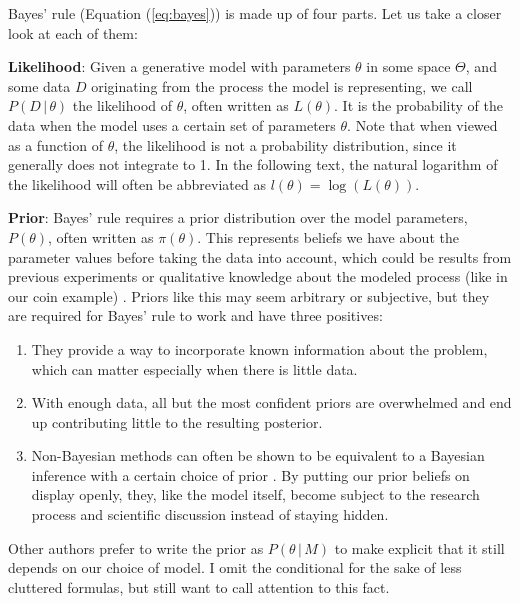 \documentclass[12pt, a4paper]{report}
\begin{document}
Bayes' rule (Equation (\ref{eq:bayes})) is made up of four parts.
Let us take a closer look at each of them:

\textbf{Likelihood}: Given a generative model with parameters $\theta$ in some space $\Theta$, and some data $D$ originating from the process the model is representing, we call $P(D \,|\, \theta)$ the likelihood of $\theta$, often written as $L(\theta)$.
It is the probability of the data when the model uses a certain set of parameters $\theta$.
Note that when viewed as a function of $\theta$, the likelihood is not a probability distribution, since it generally does not integrate to 1.
In the following text, the natural logarithm of the likelihood will often be abbreviated as $l(\theta) = \log(L(\theta))$.

\textbf{Prior}: Bayes' rule requires a prior distribution over the model parameters, $P(\theta)$, often written as $\pi(\theta)$.
This represents beliefs we have about the parameter values before taking the data into account, which could be results from previous experiments or qualitative knowledge about the modeled process (like in our coin example) \cite[p. 34 f.]{mcelreath}.
Priors like this may seem arbitrary or subjective, but they are required for Bayes' rule to work and have three positives:
\begin{enumerate}
    \item They provide a way to incorporate known information about the problem, which can matter especially when there is little data.
    \item With enough data, all but the most confident priors are overwhelmed and end up contributing little to the resulting posterior.
    \item Non-Bayesian methods can often be shown to be equivalent to a Bayesian inference with a certain choice of prior \cite[36]{mcelreath}. By putting our prior beliefs on display openly, they, like the model itself, become subject to the research process and scientific discussion instead of staying hidden. 
\end{enumerate}
Other authors prefer to write the prior as $P(\theta \, | \, M)$ to make explicit that it still depends on our choice of model.
I omit the conditional for the sake of less cluttered formulas, but still want to call attention to this fact.
\end{document}

